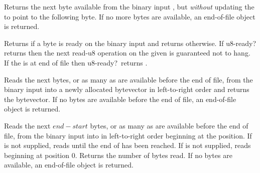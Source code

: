 \begin{entry}{%
}

Returns the next byte available from the binary input ,
but {\em without} updating the  to point to the following
byte.  If no more bytes are available, an end-of-file object is returned.  

\end{entry}

\begin{entry}{%
}

Returns \schtrue{} if a byte is ready on the binary input 
and returns \schfalse{} otherwise.  If {\cf u8-ready?} returns
\schtrue{} then the next {\cf read-u8} operation on the given
 is guaranteed not to hang.  If the  is at end of
file then {\cf u8-ready?}\ returns \schtrue.  

\end{entry}

\begin{entry}{%
}

Reads the next  bytes, or as many as are available before the end of file,
from the binary
input  into a newly allocated bytevector in left-to-right order
and returns the bytevector.
If no bytes are available before the end of file,
an end-of-file object is returned.

\end{entry}

\begin{entry}{%
}

Reads the next $end - start$ bytes, or as many as are available
before the end of file,
from the binary
input  into  in left-to-right order
beginning at the  position.  If  is not supplied,
reads until the end of  has been reached.  If
 is not supplied, reads beginning at position 0.
Returns the number of bytes read.
If no bytes are available, an end-of-file object is returned.

\end{entry}


